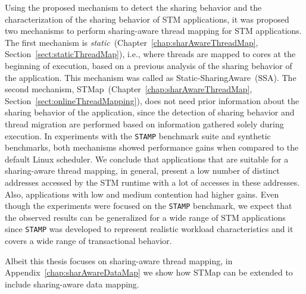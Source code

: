 Using the proposed mechanism to detect the sharing behavior and the characterization of the sharing behavior of STM applications, it was proposed two mechanisms to perform sharing-aware thread mapping for STM applications. The first mechanism is \emph{static}~(Chapter~\ref{chap:sharAwareThreadMap}, Section~\ref{sect:staticThreadMap}), i.e., where threads are mapped to cores at the beginning of execution, based on a previous analysis of the sharing behavior of the application. This mechanism was called as Static-SharingAware~(SSA). The second mechanism, STMap~(Chapter~\ref{chap:sharAwareThreadMap}, Section~\ref{sect:onlineThreadMapping}), does not need prior information about the sharing behavior of the application, since the detection of sharing behavior and thread migration are performed based on information gathered solely during execution. In experiments with the \texttt{STAMP} benchmark suite and synthetic benchmarks, both mechanisms showed performance gains when compared to the default Linux scheduler. We conclude that applications that are suitable for a sharing-aware thread mapping, in general, present a low number of distinct addresses accessed by the STM runtime with a lot of accesses in these addresses. Also, applications with low and medium contention had higher gains. Even though the experiments were focused on the \texttt{STAMP} benchmark, we expect that the observed results can be generalized for a wide range of STM applications since \texttt{STAMP} was developed to represent realistic workload characteristics and it covers a wide range of transactional behavior.

Albeit this thesis focuses on sharing-aware thread mapping, in Appendix~\ref{chap:sharAwareDataMap} we show how STMap can be extended to include sharing-aware data mapping. 
	



